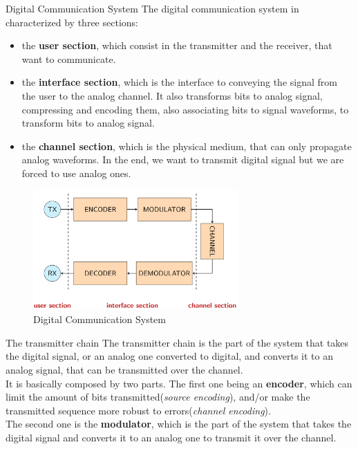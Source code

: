 \begin{section}{Digital Communication System}
The digital communication system in characterized by three sections: 

\begin{itemize}
  \item the \textbf{user section}, which consist in the transmitter and the receiver, that want to 
    communicate. 
  \item the \textbf{interface section}, which is the interface to conveying the signal from the 
    user to the analog channel. It also transforms bits to analog signal, compressing and encoding 
    them, also associating bits to signal waveforms, to transform bits to analog signal.
  \item the \textbf{channel section}, which is the physical medium, that can only propagate analog 
    waveforms. In the end, we want to transmit digital signal but we are forced to use analog ones.
\end{itemize}

\begin{figure}[h]
  \centering
  \includegraphics[width=0.7\textwidth]{img/wireless/digital communication schema.png}
  \caption{Digital Communication System}
  \label{fig:Digital Communication System}
\end{figure}
\begin{subsection}{The transmitter chain}
The transmitter chain is the part of the system that takes the digital signal, or an analog one 
converted to digital, and converts it to an analog signal, that can be transmitted over the
channel.\\
It is basically composed by two parts. The first one being an \textbf{encoder}, which can limit the amount 
of bits transmitted(\textit{source encoding}), and/or make the transmitted sequence more robust to
errors(\textit{channel encoding}).\\
The second one is the \textbf{modulator}, which is the part of the system that takes the digital
signal and converts it to an analog one to transmit it over the channel.
\end{subsection}


\end{section}
